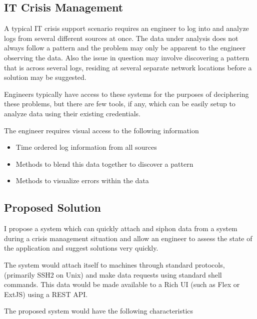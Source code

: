 \documentclass{llncs}
\begin{document}
\subsection{IT Crisis Management}

A typical IT crisis support scenario requires an engineer to log into and analyze logs from several different sources at once. The data under analysis does not always follow a pattern and the problem may only be apparent to the engineer observing the data. Also the issue in question may involve discovering a pattern that is across several logs, residing at several separate network locations before a solution may be suggested.

Engineers typically have access to these systems for the purposes of deciphering these problems, but there are few tools, if any, which can be easily setup to analyze data using their existing credentials.

The engineer requires visual access to the following information

\begin{itemize}
\item Time ordered log information from all sources
\item Methods to blend this data together to discover a pattern
\item Methods to visualize errors within the data
\end{itemize}

\subsection{Proposed Solution}

I propose a system which can quickly attach and siphon data from a system during a crisis management situation and allow an engineer to assess the state of the application and suggest solutions very quickly.

The system would attach itself to machines through standard protocols, (primarily SSH2 on Unix) and make data requests using standard shell commands. This data would be made available to a Rich UI (such as Flex or ExtJS) using a REST API.

The proposed system would have the following characteristics
\end{document}
